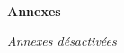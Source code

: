 \newpage
~\vspace{5cm}
\begin{center}
	{\Huge \textbf{Annexes}}
\end{center}
\newpage

\appendix

\textit{Annexes désactivées}

%
%
%
%
%
%
%


